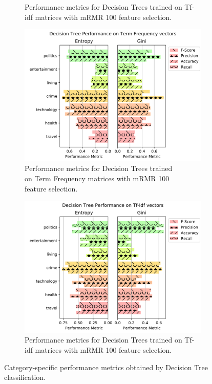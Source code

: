 \documentclass[11pt]{article}
\begin{document}
\begin{figure}[h!]
\begin{subfigure}{.5\textwidth}
	  \caption{Performance metrics for Decision Trees trained on Tf-idf matrices with mRMR 100 feature selection.}
	  \label{fig:sub2}
	\end{subfigure}
	\begin{subfigure}{.5\textwidth}
	  \centering
 	  \includegraphics[width=\linewidth]{figures/decision_tree/mrmr/tf_prec_n_rec}
	  \caption{Performance metrics for Decision Trees trained \\
		on Term Frequency matrices with mRMR 100 \\ feature selection.}
	  \label{fig:sub1}
	\end{subfigure}%
	\begin{subfigure}{.5\textwidth}
	  \centering
	  \includegraphics[width=\linewidth]{figures/decision_tree/mrmr/tfidf_prec_n_rec}
	  \caption{Performance metrics for Decision Trees trained on Tf-idf matrices with mRMR 100 feature selection.}
	  \label{fig:sub2}
	\end{subfigure}
	\caption{Category-specific performance metrics obtained by Decision Tree classification.}
\end{figure}
\end{document}
